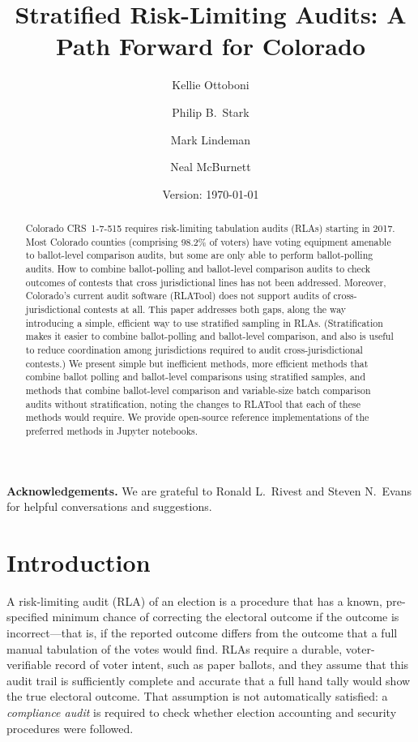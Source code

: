 \documentclass[runningheads]{llncs}
\title{Stratified Risk-Limiting Audits: A Path Forward for Colorado}
\author{
   Kellie Ottoboni\inst{1}\orcidID{0000-0002-9107-3402} \and
   Philip B.~Stark\inst{1}\orcidID{0000-0002-3771-9604} \and
   Mark Lindeman\inst{2}\orcidID{0000-0001-8815-815X} \and
   Neal McBurnett\orcidID{0000-0001-8667-1830} 
}
\institute{
Department of Statistics, University of California, Berkeley, CA, USA \and
Department of Political Science, Columbia University, NY, USA}
\date{Version: \today}
\begin{document}
\maketitle


\begin{abstract}
Colorado CRS~1-7-515 requires risk-limiting tabulation audits (RLAs) starting in 2017.
Most Colorado counties (comprising 98.2\% of voters) have voting equipment amenable to ballot-level comparison audits, but some
are only able to perform ballot-polling audits. 
How to combine ballot-polling and ballot-level comparison audits to check outcomes of contests that cross jurisdictional lines has not been addressed.
Moreover, Colorado's current audit software (RLATool) does not support audits of cross-jurisdictional contests at all. 
This paper addresses both gaps, along the way introducing a simple, efficient way to use 
stratified sampling in RLAs.
(Stratification makes it easier to combine ballot-polling and ballot-level comparison, and also is useful to reduce coordination among jurisdictions required to audit cross-jurisdictional contests.)
We present simple but inefficient methods, more efficient methods
that combine ballot polling and ballot-level comparisons using stratified samples,
and methods that combine ballot-level comparison and
variable-size batch comparison audits without stratification,
noting the changes to RLATool that each of these methods would require.
We provide open-source reference implementations of the preferred methods in Jupyter notebooks.

\end{abstract}

\noindent
\textbf{Acknowledgements.}
We are grateful to Ronald L.~Rivest and Steven N.~Evans for helpful conversations and suggestions.

\section{Introduction}
A risk-limiting audit (RLA) of an election is a procedure that
has a known, pre-specified minimum chance of correcting the electoral outcome if the outcome
is incorrect---that is, if the reported outcome differs from the outcome that a full manual
tabulation of the votes would find. 
RLAs require a durable, voter-verifiable record of voter intent, such as paper ballots,
and they assume that this audit trail is sufficiently complete and accurate that a full hand
tally would show the true electoral outcome.
That assumption is not automatically satisfied: a \emph{compliance audit}
\cite{starkWagner12} 
is required to check whether election accounting and security procedures were followed.
\end{document}
